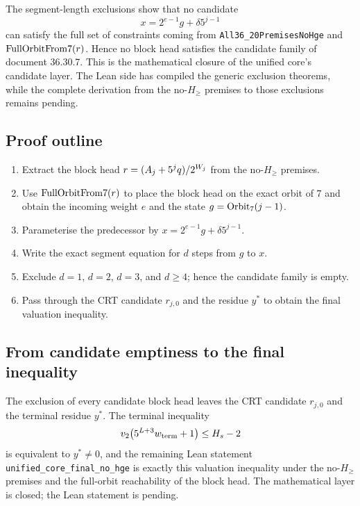 The segment-length exclusions show that no candidate
\begin{equation*}
  x=2^{e-1}g+\delta5^{j-1}
\end{equation*}
can satisfy the full set of constraints coming from
\texttt{All36\_20PremisesNoHge} and $\mathrm{FullOrbitFrom7}(r)$.  Hence no block
head satisfies the candidate family of document 36.30.7.  This is the
mathematical closure of the unified core's candidate layer.  The Lean
side has compiled the generic exclusion theorems, while the complete
derivation from the no-$H_{\ge}$ premises to those exclusions remains
pending.

\subsection{Proof outline}

\begin{enumerate}[leftmargin=*]
\item Extract the block head
  $r=(A_j+5^jq)/2^{W_j}$ from the no-$H_{\ge}$ premises.
\item Use $\mathrm{FullOrbitFrom7}(r)$ to place the block head on the exact orbit of
  $7$ and obtain the incoming weight $e$ and the state
  $g=\mathrm{Orbit}_7(j-1)$.
\item Parameterise the predecessor by
  $x=2^{e-1}g+\delta5^{j-1}$.
\item Write the exact segment equation for $d$ steps from $g$ to $x$.
\item Exclude $d=1$, $d=2$, $d=3$, and $d\ge4$; hence the candidate
  family is empty.
\item Pass through the CRT candidate $r_{j,0}$ and the residue $y^*$ to
  obtain the final valuation inequality.
\end{enumerate}

\subsection{From candidate emptiness to the final inequality}

The exclusion of every candidate block head leaves the CRT candidate
$r_{j,0}$ and the terminal residue $y^*$.  The terminal inequality
\begin{equation*}
  v_2\!\left(5^{L+3}w_{\mathrm{term}}+1\right)\le H_s-2
\end{equation*}
is equivalent to $y^*\ne0$, and the remaining Lean statement
\texttt{unified\_core\_final\_no\_hge} is exactly this valuation inequality
under the no-$H_{\ge}$ premises and the full-orbit reachability of the
block head.  The mathematical layer is closed; the Lean statement is
pending.


